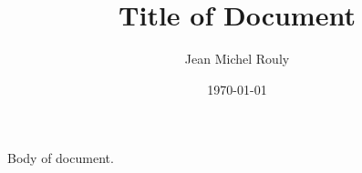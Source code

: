 \documentclass[fleqn,letterpaper,10pt]{article}
\title{Title of Document}
\author{Jean Michel Rouly}
\date{\today}
\begin{document}
\maketitle


Body of document.
\end{document}
